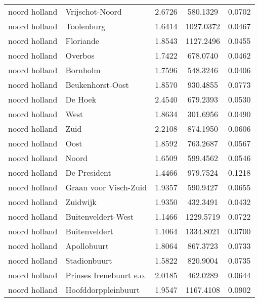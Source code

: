 \begin{longtable}{llccc}
	noord holland & Vrijschot-Noord                  & 2.6726  & 580.1329  & 0.0702          \\
	noord holland & Toolenburg                       & 1.6414  & 1027.0372 & 0.0467          \\
	noord holland & Floriande                        & 1.8543  & 1127.2496 & 0.0455          \\
	noord holland & Overbos                          & 1.7422  & 678.0740  & 0.0462          \\
	noord holland & Bornholm                         & 1.7596  & 548.3246  & 0.0406          \\
	noord holland & Beukenhorst-Oost                 & 1.8570  & 930.4855  & 0.0773          \\
	noord holland & De Hoek                          & 2.4540  & 679.2393  & 0.0530          \\
	noord holland & West                             & 1.8634  & 301.6956  & 0.0490          \\
	noord holland & Zuid                             & 2.2108  & 874.1950  & 0.0606          \\
	noord holland & Oost                             & 1.8592  & 763.2687  & 0.0567          \\
	noord holland & Noord                            & 1.6509  & 599.4562  & 0.0546          \\
	noord holland & De President                     & 1.4466  & 979.7524  & 0.1218          \\
	noord holland & Graan voor Visch-Zuid            & 1.9357  & 590.9427  & 0.0655          \\
	noord holland & Zuidwijk                         & 1.9350  & 432.3491  & 0.0432          \\
	noord holland & Buitenveldert-West               & 1.1466  & 1229.5719 & 0.0722          \\
	noord holland & Buitenveldert                    & 1.1064  & 1334.8021 & 0.0700          \\
	noord holland & Apollobuurt                      & 1.8064  & 867.3723  & 0.0733          \\
	noord holland & Stadionbuurt                     & 1.5822  & 820.9004  & 0.0735          \\
	noord holland & Prinses Irenebuurt e.o.          & 2.0185  & 462.0289  & 0.0644          \\
	noord holland & Hoofddorppleinbuurt              & 1.9547  & 1167.4108 & 0.0902          \\

\end{longtable}
